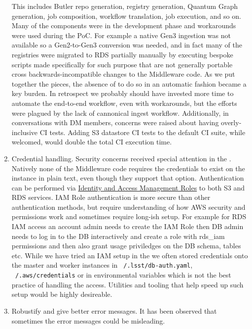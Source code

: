 \begin{enumerate}
This includes Butler repo generation, registry generation, Quantum Graph generation, job composition, workflow translation, job execution, and so on.
Many of the components were in the development phase and workarounds were used during the PoC.
For example a native Gen3 ingestion was not available so a Gen2-to-Gen3 conversion was needed, and in fact many of the registries were migrated to RDS partially manually by executing bespoke scripts made specifically for such purpose that are not generally portable cross backwards-incompatible changes to the Middleware code.
As we put together the pieces, the absence of to do so in an automatic fashion became a key burden.
In retrospect we probably should have invested more time to automate the end-to-end workflow, even with workarounds, but the efforts were plagued by the lack of cannonical ingest workflow. Additionally, in conversations with DM members, concerns were raised about having overly-inclusive CI tests. Adding S3 datastore CI tests to the default CI suite, while welcomed, would double the total CI execution time.
\item Credential handling.
Security concerns received special attention in the \poc. Natively none of the Middleware code requires the credentials to exist on the instance in plain text, even though they support that option. Authentication can be performed via \href{https://docs.aws.amazon.com/IAM/latest/UserGuide/id_roles.html}{Identity and Access Management Roles} to both S3 and RDS services. IAM Role authentication is more secure than other authentication methods, but require understanding of how AWS security and permissions work and sometimes require long-ish setup. For example for RDS IAM access an account admin needs to create the IAM Role then DB admin needs to log in to the DB interactively and create a role with rds\_iam permissions and then also grant usage priviledges on the DB schema, tables etc. While we have tried an IAM setup in the \poc we often stored credentials onto the master and worker instances in \texttt{~/.lsst/db-auth.yaml}, \texttt{~/.aws/credentials} or in environmental variables which is not the best practice of handling the access. Utilities and tooling that help speed up such setup would be highly desireable. 
\item Robustify and give better error messages.
It has been observed that sometimes the error messages could be misleading.

\end{enumerate}
